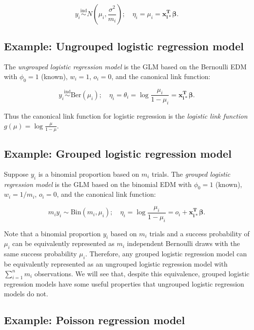 \documentclass[
  11pt,
  letterpaper,
  oneside]{book}
\theoremstyle{definition}
\theoremstyle{plain}
\theoremstyle{plain}
\theoremstyle{plain}
\theoremstyle{remark}
\begin{document}
\[
y_i \overset{\text{ind}}\sim N(\mu_i, {\textstyle \frac{\sigma^2}{m_i}}); \quad \eta_i = \mu_i = \boldsymbol{x_{i*}^T} \boldsymbol{\beta}.
\]

\hypertarget{example-ungrouped-logistic-regression-model}{%
\subsection{Example: Ungrouped logistic regression
model}\label{example-ungrouped-logistic-regression-model}}

The \emph{ungrouped logistic regression model} is the GLM based on the
Bernoulli EDM with \(\phi_0 = 1\) (known), \(w_i = 1\), \(o_i = 0\), and
the canonical link function:

\[
y_i \overset{\text{ind}}\sim \text{Ber}(\mu_i); \quad \eta_i = \theta_i = \log\frac{\mu_i}{1-\mu_i} = \boldsymbol{x_{i*}^T} \boldsymbol{\beta}.
\]

Thus the canonical link function for logistic regression is the
\emph{logistic link function} \(g(\mu) = \log \frac{\mu}{1-\mu}\).

\hypertarget{example-grouped-logistic-regression-model}{%
\subsection{Example: Grouped logistic regression
model}\label{example-grouped-logistic-regression-model}}

Suppose \(y_i\) is a binomial proportion based on \(m_i\) trials. The
\emph{grouped logistic regression model} is the GLM based on the
binomial EDM with \(\phi_0 = 1\) (known), \(w_i = 1/m_i\), \(o_i = 0\),
and the canonical link function:

\[
m_i y_i \sim \text{Bin}(m_i, \mu_i); \quad \eta_i = \log \frac{\mu_i}{1-\mu_i} = o_i + \boldsymbol{x^T_{i*}}\boldsymbol{\beta}.
\]

Note that a binomial proportion \(y_i\) based on \(m_i\) trials and a
success probability of \(\mu_i\) can be equivalently represented as
\(m_i\) independent Bernoulli draws with the same success probability
\(\mu_i\). Therefore, any grouped logistic regression model can be
equivalently represented as an ungrouped logistic regression model with
\(\sum_{i = 1}^n m_i\) observations. We will see that, despite this
equivalence, grouped logistic regression models have some useful
properties that ungrouped logistic regression models do not.

\hypertarget{example-poisson-regression-model}{%
\subsection{Example: Poisson regression
model}\label{example-poisson-regression-model}}
\end{document}
